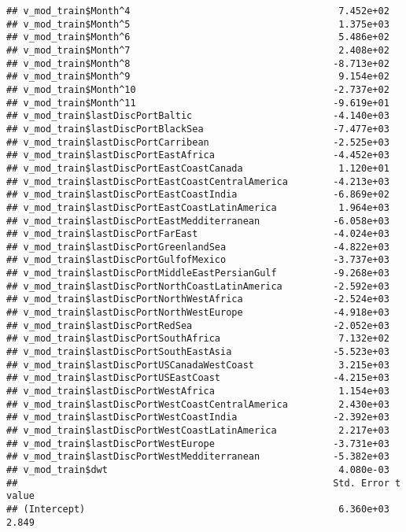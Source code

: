 \documentclass[]{article}
\begin{document}
\begin{verbatim}
## v_mod_train$Month^4                                     7.452e+02
## v_mod_train$Month^5                                     1.375e+03
## v_mod_train$Month^6                                     5.486e+02
## v_mod_train$Month^7                                     2.408e+02
## v_mod_train$Month^8                                    -8.713e+02
## v_mod_train$Month^9                                     9.154e+02
## v_mod_train$Month^10                                   -2.737e+02
## v_mod_train$Month^11                                   -9.619e+01
## v_mod_train$lastDiscPortBaltic                         -4.140e+03
## v_mod_train$lastDiscPortBlackSea                       -7.477e+03
## v_mod_train$lastDiscPortCarribean                      -2.525e+03
## v_mod_train$lastDiscPortEastAfrica                     -4.452e+03
## v_mod_train$lastDiscPortEastCoastCanada                 1.120e+01
## v_mod_train$lastDiscPortEastCoastCentralAmerica        -4.213e+03
## v_mod_train$lastDiscPortEastCoastIndia                 -6.869e+02
## v_mod_train$lastDiscPortEastCoastLatinAmerica           1.964e+03
## v_mod_train$lastDiscPortEastMedditerranean             -6.058e+03
## v_mod_train$lastDiscPortFarEast                        -4.024e+03
## v_mod_train$lastDiscPortGreenlandSea                   -4.822e+03
## v_mod_train$lastDiscPortGulfofMexico                   -3.737e+03
## v_mod_train$lastDiscPortMiddleEastPersianGulf          -9.268e+03
## v_mod_train$lastDiscPortNorthCoastLatinAmerica         -2.592e+03
## v_mod_train$lastDiscPortNorthWestAfrica                -2.524e+03
## v_mod_train$lastDiscPortNorthWestEurope                -4.918e+03
## v_mod_train$lastDiscPortRedSea                         -2.052e+03
## v_mod_train$lastDiscPortSouthAfrica                     7.132e+02
## v_mod_train$lastDiscPortSouthEastAsia                  -5.523e+03
## v_mod_train$lastDiscPortUSCanadaWestCoast               3.215e+03
## v_mod_train$lastDiscPortUSEastCoast                    -4.215e+03
## v_mod_train$lastDiscPortWestAfrica                      1.154e+03
## v_mod_train$lastDiscPortWestCoastCentralAmerica         2.430e+03
## v_mod_train$lastDiscPortWestCoastIndia                 -2.392e+03
## v_mod_train$lastDiscPortWestCoastLatinAmerica           2.217e+03
## v_mod_train$lastDiscPortWestEurope                     -3.731e+03
## v_mod_train$lastDiscPortWestMedditerranean             -5.382e+03
## v_mod_train$dwt                                         4.080e-03
##                                                        Std. Error t value
## (Intercept)                                             6.360e+03   2.849

\end{verbatim}
\end{document}
